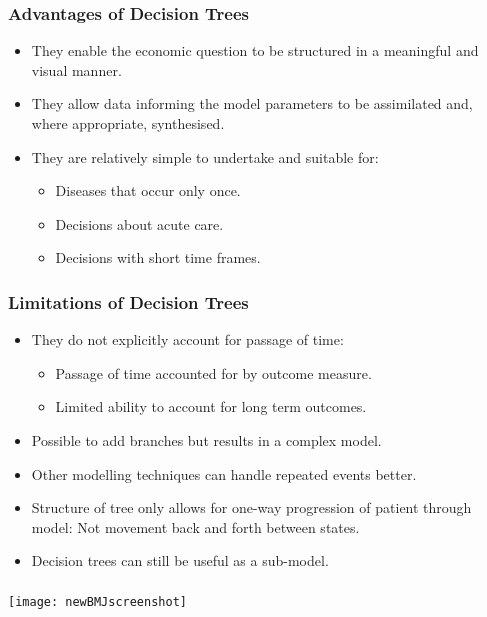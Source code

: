 \documentclass[t]{beamer}
\begin{document}
\begin{frame}
\frametitle{Advantages of Decision Trees}

	\begin{itemize}
		\item They enable the economic question to be structured in a \alert{meaningful} and \alert{visual} manner.
		\pause
		\item  They allow data informing the model parameters to be assimilated and, where appropriate, synthesised.
		\pause
		\item They are relatively simple to undertake and suitable for:
		\begin{itemize}
			\item Diseases that occur only once.
			\item Decisions about acute care.
			\item Decisions with short time frames.
		\end{itemize}
	\end{itemize}
\end{frame}


\begin{frame}
\frametitle{Limitations of Decision Trees}

	\begin{itemize}
		\item They do not explicitly account for passage of time:
			\begin{itemize}
				\item Passage of time accounted for by outcome measure.
				\item Limited ability to account for long term outcomes.
			\end{itemize}
			\pause
		\item Possible to add branches but results in a complex model.
		\item Other modelling techniques can handle repeated events better.
		\item Structure of tree only allows for one-way progression of patient through model: Not movement back and forth between states.
		\item Decision trees can still be useful as a sub-model.
		\end{itemize}
\end{frame}


\begin{frame}
\frametitle{}
 \texttt{[image: newBMJscreenshot]}
\end{frame} 
\end{document}
